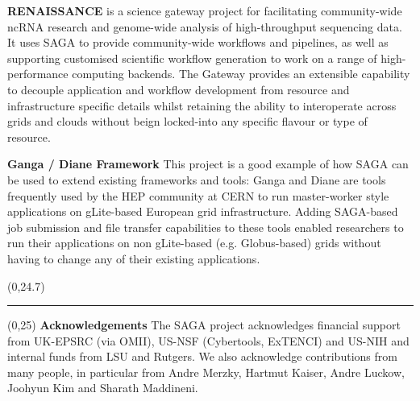 \documentclass[a0b,portrait]{a0poster}
\begin{document}
\begin{textblock}{7}
\textbf{\color{DarkBlue} RENAISSANCE} is a science gateway project for
facilitating community-wide ncRNA research and genome-wide analysis of
high-throughput sequencing data. It uses SAGA to provide
community-wide workflows and pipelines, as well as supporting
customised scientific workflow generation to work on a range of
high-performance computing backends. The Gateway provides an
extensible capability to decouple application and workflow development
from resource and infrastructure specific details whilst retaining the
ability to interoperate across grids and clouds without beign
locked-into any specific flavour or type of resource.



\textbf{\color{DarkBlue} Ganga / Diane Framework } This project is a good
example of how SAGA can be used to extend existing frameworks and tools: Ganga
and Diane are tools frequently used by the HEP community at CERN to run
master-worker style applications on  gLite-based European grid infrastructure.
Adding SAGA-based job submission and file transfer capabilities to these tools
enabled researchers to run their applications on non gLite-based (e.g.
Globus-based) grids without having to change any of their existing
applications.


\end{textblock}

\begin{textblock}{15}(0,24.7)
\color{LightGray}
\rule{\linewidth}{2pt}
\end{textblock}

\begin{textblock}{15}(0,25)
\textbf{\color{DarkBlue} Acknowledgements} The SAGA project acknowledges
financial support from UK-EPSRC (via OMII), US-NSF (Cybertools,
ExTENCI) and US-NIH and internal funds from LSU and Rutgers.  We also
acknowledge contributions from many people, in particular from Andre
Merzky, Hartmut Kaiser, Andre Luckow, Joohyun Kim and Sharath
Maddineni.

\end{textblock}
\end{document}
